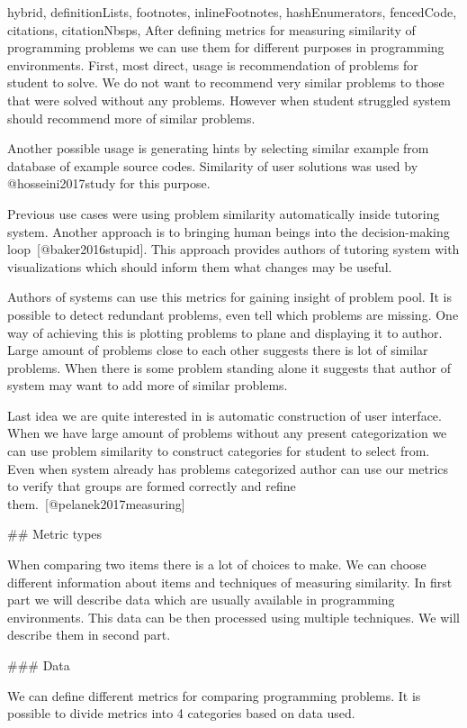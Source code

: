 \documentclass[
  digital, %
  table,   %
  nolof,     %
  nolot,     %
  nocover
]{fithesis3}
\begin{document}
\begin{markdown*}{%
  hybrid,
  definitionLists,
  footnotes,
  inlineFootnotes,
  hashEnumerators,
  fencedCode,
  citations,
  citationNbsps,
}
After defining metrics for measuring similarity of programming problems we can use them for different purposes in programming environments. First, most direct, usage is recommendation of problems for student to solve. We do not want to recommend very similar problems to those that were solved without any problems. However when student struggled system should recommend more of similar problems.

Another possible usage is generating hints by selecting similar example from database of example source codes. Similarity of user solutions was used by @hosseini2017study for this purpose.

Previous use cases were using problem similarity automatically inside tutoring system. Another approach is to bringing human beings into the decision-making loop~[@baker2016stupid]. This approach provides authors of tutoring system with visualizations which should inform them what changes may be useful.

Authors of systems can use this metrics for gaining insight of problem pool. It is possible to detect redundant problems, even tell which problems are missing. One way of achieving this is plotting problems to plane and displaying it to author. Large amount of problems close to each other suggests there is lot of similar problems. When there is some problem standing alone it suggests that author of system may want to add more of similar problems.

Last idea we are quite interested in is automatic construction of user interface. When we have large amount of problems without any present categorization we can use problem similarity to construct categories for student to select from. Even when system already has problems categorized author can use our metrics to verify that groups are formed correctly and refine them.~[@pelanek2017measuring]

## Metric types

When comparing two items there is a lot of choices to make. We can choose different information about items and techniques of measuring similarity. In first part we will describe data which are usually available in programming environments. This data can be then processed using multiple techniques. We will describe them in second part.

### Data

We can define different metrics for comparing programming problems. It is possible to divide metrics into 4 categories based on data used.


\end{markdown*}
\end{document}
